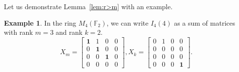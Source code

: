 \documentclass[12pt, a4paper]{amsart}
\theoremstyle{definition}
\newtheorem{expl}[thm]{Example}
\numberwithin{equation}{section}
\newcommand{\F}{\mathbb{F}}
\begin{document}
Let us demonstrate Lemma~\ref{lem:r>m} with an example.
\begin{expl}
    In the ring $M_4(\F_2)$, we can write $I_4(4)$ as a sum of matrices with rank $m=3$ and rank $k=2$.
    \[
    X_m =
    \begin{bmatrix}
        \mathbf{1} & 1 & 0 & 0\\
        0 & \mathbf{1} & 0 & 0\\
        0 & 0 & \mathbf{1} & 0\\
        0 & 0 & 0 & 0
    \end{bmatrix},
    X_k =
    \begin{bmatrix}
        0 & 1 & 0 & 0\\
        0 & 0 & 0 & 0\\
        0 & 0 & 0 & 0\\
        0 & 0 & 0 & \mathbf{1}
    \end{bmatrix}.
    \]
\end{expl}
\end{document}
